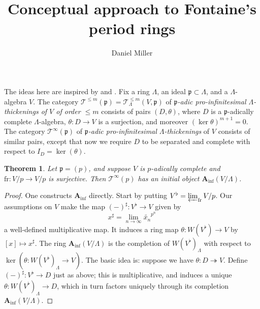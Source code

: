 \documentclass{article}
\title{Conceptual approach to Fontaine's period rings}
\author{Daniel Miller}
\newcommand{\cT}{\mathcal{T}}
\newcommand{\fp}{\mathfrak{p}}
\newcommand{\Ainf}{\mathbf{A}_\mathrm{inf}}
\newcommand{\frobenius}{\mathrm{fr}}
\newtheorem{theorem}{Theorem}
\begin{document}
\maketitle





The ideas here are inspired by \cite{fontaine-1994} and \cite{scholze-2012}. 
Fix a ring $\Lambda$, an ideal $\fp\subset \Lambda$, and a $\Lambda$-algebra 
$V$. The category $\cT^{\leqslant m}(\fp) = \cT_\Lambda^{\leqslant m}(V,\fp)$ 
of \emph{$\fp$-adic pro-infinitesimal $\Lambda$-thickenings of $V$ of order 
$\leqslant m$} consists of pairs $(D,\theta)$, where $D$ is a $\fp$-adically 
complete $\Lambda$-algebra, $\theta:D\to V$ is a surjection, and moreover 
$(\ker\theta)^{m+1}=0$. The category $\cT^\infty(\fp)$ of 
\emph{$\fp$-adic pro-infinitesimal $\Lambda$-thickenings} of $V$ consists of 
similar pairs, except that now we require $D$ to be separated and complete with 
respect to $I_D=\ker(\theta)$. 

\begin{theorem}
Let $\fp=(p)$, and suppose $V$ is $p$-adically complete and 
$\frobenius:V/p\to V/p$ is surjective. Then $\cT^\infty(p)$ has an initial 
object $\Ainf(V/\Lambda)$. 
\end{theorem}
\begin{proof}
One constructs $\Ainf$ directly. Start by putting 
$V^\flat = \varprojlim_\frobenius V/p$. Our assumptions on $V$ make the map 
$(-)^\sharp:V^\flat \to V$ given by 
\[
  x^\sharp = \lim_{n\to \infty} \widetilde{x_n}^{p^n} 
\]
a well-defined multiplicative map. It induces a ring map 
$\theta:W(V^\flat) \to V$ by $[x]\mapsto x^\sharp$. The ring 
$\Ainf(V/\Lambda)$ is the completion of 
$W(V^\flat)_\Lambda$ with respect to $\ker(\theta:W(V^\flat)_\Lambda\to V)$. 
The basic idea is: suppose we have $\theta:D\twoheadrightarrow V$. Define 
$(-)^\sharp:V^\flat\to D$ just as above; this is multiplicative, and induces 
a unique $\theta:W(V^\flat)_\Lambda\to D$, which in turn factors uniquely 
through its completion $\Ainf(V/\Lambda)$. 
\end{proof}







\end{document}
